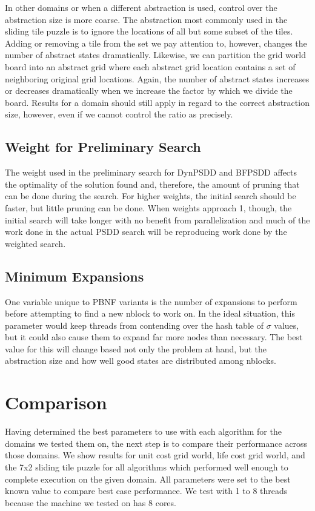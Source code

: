 \documentclass{article}
\begin{document}
In other domains or when a different abstraction is used, control over the abstraction size is more coarse. The abstraction most commonly used in the sliding tile puzzle is to ignore the locations of all but some subset of the tiles. Adding or removing a tile from the set we pay attention to, however, changes the number of abstract states dramatically. Likewise, we can partition the grid world board into an abstract grid where each abstract grid location contains a set of neighboring original grid locations. Again, the number of abstract states increases or decreases dramatically when we increase the factor by which we divide the board. Results for a domain should still apply in regard to the correct abstraction size, however, even if we cannot control the ratio as precisely.
\subsection{Weight for Preliminary Search}
The weight used in the preliminary search for DynPSDD and BFPSDD affects the optimality of the solution found and, therefore, the amount of pruning that can be done during the search. For higher weights, the initial search should be faster, but little pruning can be done. When weights approach 1, though, the initial search will take longer with no benefit from parallelization and much of the work done in the actual PSDD search will be reproducing work done by the weighted search.
\subsection{Minimum Expansions}
One variable unique to PBNF variants is the number of expansions to perform before attempting to find a new nblock to work on. In the ideal situation, this parameter would keep threads from contending over the hash table of $\sigma$ values, but it could also cause them to expand far more nodes than necessary. The best value for this will change based not only the problem at hand, but the abstraction size and how well good states are distributed among nblocks.
\section{Comparison}
Having determined the best parameters to use with each algorithm for the domains we tested them on, the next step is to compare their performance across those domains. We show results for unit cost grid world, life cost grid world, and the 7x2 sliding tile puzzle for all algorithms which performed well enough to complete execution on the given domain. All parameters were set to the best known value to compare best case performance. We test with 1 to 8 threads because the machine we tested on has 8 cores.
\end{document}

